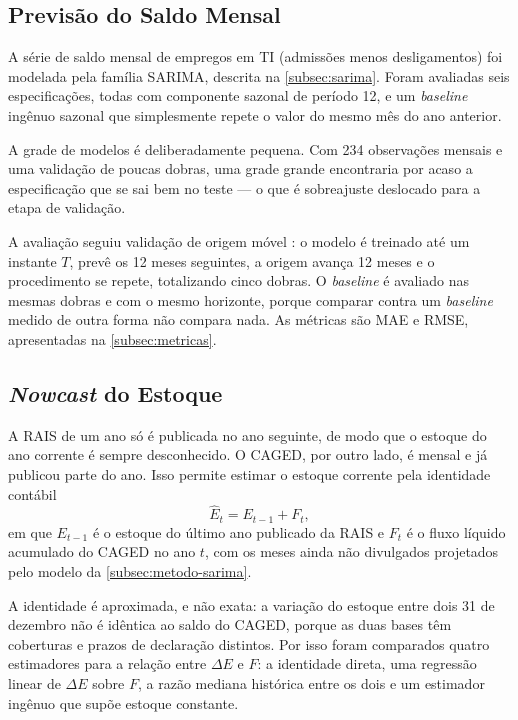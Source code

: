 \subsection{Previsão do Saldo Mensal}
\label{subsec:metodo-sarima}

A série de saldo mensal de empregos em TI (admissões menos desligamentos) foi modelada pela família SARIMA, descrita na \autoref{subsec:sarima}. Foram avaliadas seis especificações, todas com componente sazonal de período 12, e um \textit{baseline} ingênuo sazonal que simplesmente repete o valor do mesmo mês do ano anterior.

A grade de modelos é deliberadamente pequena. Com 234 observações mensais e uma validação de poucas dobras, uma grade grande encontraria por acaso a especificação que se sai bem no teste --- o que é sobreajuste deslocado para a etapa de validação.

A avaliação seguiu validação de origem móvel \cite{Tashman2000}: o modelo é treinado até um instante $T$, prevê os 12 meses seguintes, a origem avança 12 meses e o procedimento se repete, totalizando cinco dobras. O \textit{baseline} é avaliado nas mesmas dobras e com o mesmo horizonte, porque comparar contra um \textit{baseline} medido de outra forma não compara nada. As métricas são MAE e RMSE, apresentadas na \autoref{subsec:metricas}.

\subsection{\textit{Nowcast} do Estoque}
\label{subsec:metodo-nowcast}

A RAIS de um ano só é publicada no ano seguinte, de modo que o estoque do ano corrente é sempre desconhecido. O CAGED, por outro lado, é mensal e já publicou parte do ano. Isso permite estimar o estoque corrente pela identidade contábil
\begin{equation}
    \widehat{E}_t = E_{t-1} + F_t,
\end{equation}
em que $E_{t-1}$ é o estoque do último ano publicado da RAIS e $F_t$ é o fluxo líquido acumulado do CAGED no ano $t$, com os meses ainda não divulgados projetados pelo modelo da \autoref{subsec:metodo-sarima}.

A identidade é aproximada, e não exata: a variação do estoque entre dois 31 de dezembro não é idêntica ao saldo do CAGED, porque as duas bases têm coberturas e prazos de declaração distintos. Por isso foram comparados quatro estimadores para a relação entre $\Delta E$ e $F$: a identidade direta, uma regressão linear de $\Delta E$ sobre $F$, a razão mediana histórica entre os dois e um estimador ingênuo que supõe estoque constante.

